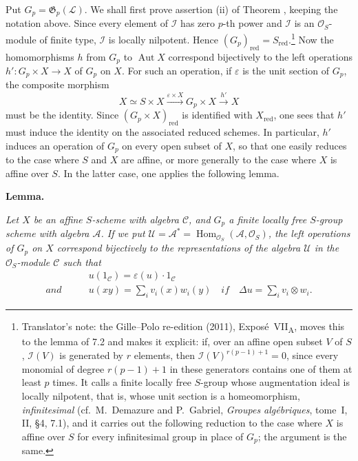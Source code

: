 Put \(G_p=\mathfrak G_p(\mathcal L)\). We shall first prove assertion
(ii) of Theorem , keeping the notation above. Since every element
of \(\mathcal I\) has zero \(p\)-th power and \(\mathcal I\) is an
\(\mathcal O_S\)-module of finite type, \(\mathcal I\) is locally
nilpotent. Hence \((G_p)_{\mathrm{red}}=S_{\mathrm{red}}\).\footnote{Translator's
note: the Gille--Polo re-edition (2011), Expos\'e~VII\textsubscript{A},
moves this to the lemma of 7.2 and makes it explicit: if, over an affine
open subset \(V\) of \(S\), \(\mathcal I(V)\) is generated by \(r\)
elements, then \(\mathcal I(V)^{r(p-1)+1}=0\), since every monomial of
degree \(r(p-1)+1\) in these generators contains one of them at least
\(p\) times. It calls a finite locally free \(S\)-group whose augmentation
ideal is locally nilpotent, that is, whose unit section is a
homeomorphism, \emph{infinitesimal} (cf.\ M.~Demazure and P.~Gabriel,
\textit{Groupes alg\'ebriques}, tome~I, II, \S4, 7.1), and it carries out
the following reduction to the case where \(X\) is affine over \(S\) for
every infinitesimal group in place of \(G_p\); the argument is the same.}
Now the
homomorphisms \(h\) from \(G_p\) to \(\operatorname{Aut}X\) correspond
bijectively to the left operations \(h':G_p\times X\to X\) of \(G_p\) on
\(X\). For such an operation, if \(\varepsilon\) is the unit section of
\(G_p\), the composite morphism
\[
  X\simeq S\times X
  \xrightarrow{\varepsilon\times X}
  G_p\times X
  \xrightarrow{h'}
  X
\]
must be the identity. Since \((G_p\times X)_{\mathrm{red}}\) is identified
with \(X_{\mathrm{red}}\), one sees that \(h'\) must induce the identity on
the associated reduced schemes. In particular, \(h'\) induces an operation
of \(G_p\) on every open subset of \(X\), so that one easily reduces to the
case where \(S\) and \(X\) are affine, or more generally to the case where
\(X\) is affine over \(S\). In the latter case, one applies the following
lemma.

\medskip
\noindent\textbf{Lemma.}
\label{sga3:VIIA:7.2.1-action-representation-lemma}

\textit{Let \(X\) be an affine \(S\)-scheme with algebra \(\mathcal C\),
and \(G_p\) a finite locally free \(S\)-group scheme with algebra
\(\mathcal A\). If we put
\(\mathcal U=\mathcal A^{*}=\operatorname{Hom}_{\mathcal O_S}(\mathcal A,\mathcal O_S)\),
the left operations of \(G_p\) on \(X\) correspond bijectively to the
representations of the algebra \(\mathcal U\) in the
\(\mathcal O_S\)-module \(\mathcal C\) such that}
\begin{align*}
  &u(1_{\mathcal C})=\varepsilon(u)\cdot1_{\mathcal C}
  \\
  \textit{and}\qquad&
  u(xy)=\sum_i v_i(x)w_i(y)
  \quad\textit{if}\quad
  \Delta u=\sum_i v_i\otimes w_i.
\end{align*}

